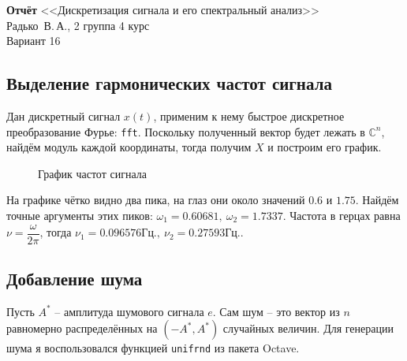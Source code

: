 \documentclass[12pt, a4paper]{article}
\begin{document}
\thispagestyle{empty}
\begin{centering}

\textbf{Отчёт} <<Дискретизация сигнала и его спектральный анализ>>\\

{Радько~В.\,А.}, 2 группа 4 курс \\
Вариант 16 \\
\end{centering}


\subsection*{Выделение гармонических частот сигнала}

Дан дискретный сигнал $x(t)$, применим к нему быстрое дискретное преобразование Фурье: \lstinline{fft}. 
Поскольку полученный вектор будет лежать в $\mathds{C}^n$, найдём модуль каждой координаты, тогда получим $X$ и построим его график.

\begin{figure}[h]
\centering
{}
\caption{\label{graph:1}График частот сигнала}
\end{figure}

На графике чётко видно два пика, на глаз они около значений $0.6$ и $1.75$. Найдём точные аргументы этих пиков: $\omega_1 = 0.60681, \: \omega_2 = 1.7337$. 
Частота в герцах равна $\nu = \dfrac{\omega}{2\pi}$, тогда $\nu_{1} = 0.096576\text{Гц.}, \:  \nu_{2} = 0.27593\text{Гц.}$.

\subsection*{Добавление шума}

Пусть $A^*$ -- амплитуда шумового сигнала $e$. Сам шум -- это вектор из $n$ равномерно распределённых на $(-A^*, A^*)$ случайных величин. Для генерации шума я воспользовался функцией \lstinline{unifrnd} из пакета Octave. 
\end{document}
